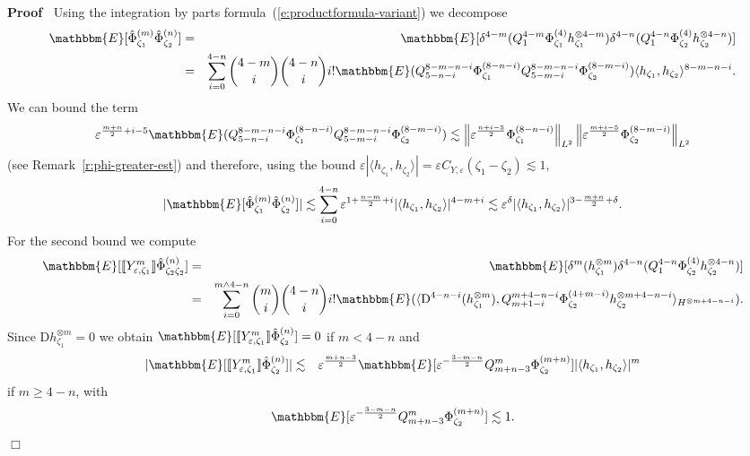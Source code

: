 \documentclass[a4paper,11pt]{article}
\newcommand{\mathD}{\mathrm{D}}
\newenvironment{proof}{\noindent\textbf{Proof\ }}{\hspace*{\fill}$\Box$\medskip}
\begin{document}
\begin{proof}
  Using the integration by parts formula~(\ref{e:productformula-variant}) we
  decompose
  \begin{eqnarray*}
    \mathbbm{E} [\hat{\Phi}^{(m)}_{\zeta_1} \hat{\Phi}^{(n)}_{\zeta_2}] & = &
    \mathbbm{E} [\delta^{4 - m} (Q_1^{4 - m} \Phi^{(4)}_{\zeta_1}
    h_{\zeta_1}^{\otimes 4 - m}) \delta^{4 - n} (Q_1^{4 - n}
    \Phi^{(4)}_{\zeta_2} h_{\zeta_2}^{\otimes 4 - n})]\\
    & = & \sum_{i = 0}^{4 - n} \binom{4 - m}{i} \binom{4 - n}{i}
    i!\mathbbm{E} (Q_{5 - n - i}^{8 - m - n - i} \Phi_{\zeta_1}^{(8 - n - i)}
    Q_{5 - m - i}^{8 - m - n - i} \Phi^{(8 - m - i)}_{\zeta_2}) \langle
    h_{\zeta_1}, h_{\zeta_2} \rangle^{8 - m - n - i} .
  \end{eqnarray*}
  We can bound the term
  \[ \varepsilon^{\frac{m + n}{2} + i - 5} \mathbbm{E} (Q_{5 - n - i}^{8 - m -
     n - i} \Phi_{\zeta_1}^{(8 - n - i)} Q_{5 - m - i}^{8 - m - n - i}
     \Phi^{(8 - m - i)}_{\zeta_2}) \lesssim \left\| \varepsilon^{\frac{n + i -
     5}{2}} \Phi_{\zeta_1}^{(8 - n - i)} \right\|_{L^2} \left\|
     \varepsilon^{\frac{m + i - 5}{2}} \Phi_{\zeta_2}^{(8 - m - i)}
     \right\|_{L^2} \]
  (see Remark~\ref{r:phi-greater-est}) and therefore, using the bound
  $\varepsilon | \langle h_{\zeta_1}, h_{\zeta_2} \rangle | = \varepsilon
  C_{Y, \varepsilon} (\zeta_1 - \zeta_2) \lesssim 1$,
  \[ | \mathbbm{E} [\hat{\Phi}^{(m)}_{\zeta_1} \hat{\Phi}^{(n)}_{\zeta_2}] |
     \lesssim \sum_{i = 0}^{4 - n} \varepsilon^{1 + \frac{n - m}{2} + i} |
     \langle h_{\zeta_1}, h_{\zeta_2} \rangle |^{4 - m + i} \lesssim
     \varepsilon^{\delta} | \langle h_{\zeta_1}, h_{\zeta_2} \rangle |^{3 -
     \frac{m + n}{2} + \delta} . \]
  For the second bound we compute
  \begin{eqnarray*}
    \mathbbm{E} [\llbracket Y^m_{\varepsilon, \zeta_1} \rrbracket
    \hat{\Phi}^{(n)}_{\zeta_2 \zeta_2}] & = & \mathbbm{E} [\delta^m
    (h_{\zeta_1}^{\otimes m}) \delta^{4 - n} (Q_1^{4 - n} \Phi^{(4)}_{\zeta_2}
    h_{\zeta_2}^{\otimes 4 - n})]\\
    & = &  \sum_{i = 0}^{m \wedge 4 - n} \binom{m}{i} \binom{4 - n}{i}
    i!\mathbbm{E} (\langle \mathD^{4 - n - i} (h_{\zeta_1}^{\otimes m}), Q_{m
    + 1 - i}^{m + 4 - n - i} \Phi^{(4 + m - i)}_{\zeta_2} h_{\zeta_2}^{\otimes
    m + 4 - n - i} \rangle_{H^{\otimes m + 4 - n - i}}) .
  \end{eqnarray*}
  Since $\mathD h^{\otimes m}_{\zeta_1} = 0$ we obtain $\mathbbm{E}
  [\llbracket Y^m_{\varepsilon, \zeta_1} \rrbracket
  \hat{\Phi}^{(n)}_{\zeta_2}] = 0$ if $m < 4 - n$ and
  \begin{eqnarray*}
    | \mathbbm{E} [\llbracket Y^m_{\varepsilon, \zeta_1} \rrbracket
    \hat{\Phi}^{(n)}_{\zeta_2}] | & \lesssim & \varepsilon^{\frac{m + n -
    3}{2}} \mathbbm{E} [\varepsilon^{- \frac{3 - m - n}{2}} Q_{m + n - 3}^m
    \Phi^{(m + n)}_{\zeta_2}] | \langle h_{\zeta_1}, h_{\zeta_2} \rangle |^m
  \end{eqnarray*}
  if $m \geqslant 4 - n$, with
  \[ \mathbbm{E} [\varepsilon^{- \frac{3 - m - n}{2}} Q_{m + n - 3}^m \Phi^{(m
     + n)}_{\zeta_2}] \lesssim 1. \]
\end{proof}
\end{document}
